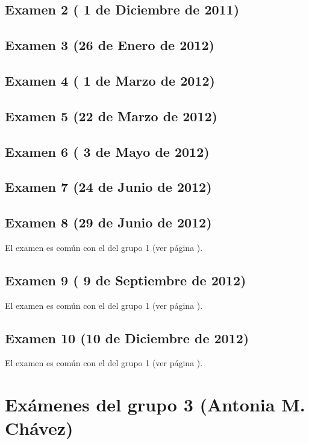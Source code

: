 \documentclass[a4paper,12pt,twoside]{book}
\begin{document}
\subsection{Examen 2 ( 1 de Diciembre de 2011)}
\subsection{Examen 3 (26 de Enero de 2012)}
\subsection{Examen 4 ( 1 de Marzo de 2012)}
\subsection{Examen 5 (22 de Marzo de 2012)}
\subsection{Examen 6 ( 3 de Mayo de 2012)}
\subsection{Examen 7 (24 de Junio de 2012)}
\subsection{Examen 8 (29 de Junio de 2012)} 
El examen es común con el del grupo 1 (ver página \pageref{examen_11_12_1_8}).
\subsection{Examen 9 ( 9 de Septiembre de 2012)} 
El examen es común con el del grupo 1 (ver página \pageref{examen_11_12_1_9}).
\subsection{Examen 10 (10 de Diciembre de 2012)} 
El examen es común con el del grupo 1 (ver página \pageref{examen_11_12_1_10}).

\section{Exámenes del grupo 3 (Antonia M. Chávez)}
\end{document}
